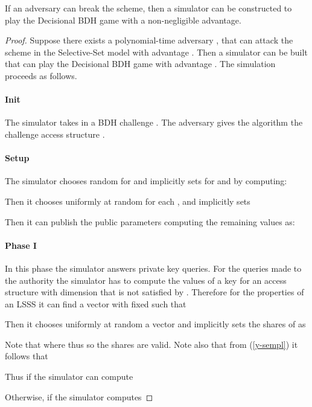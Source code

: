   \begin{theorem}
    If an adversary can break the scheme, then a simulator can be constructed to play the Decisional BDH game with a non-negligible advantage.
  \end{theorem}

  \begin{proof}
    Suppose there exists a polynomial-time adversary , that can attack the scheme in the Selective-Set model with advantage .
    Then a simulator  can be built that can play the Decisional BDH game with advantage .
    The simulation proceeds as follows.

    \paragraph*{Init}
      The simulator takes in a BDH challenge .
      The adversary gives the algorithm the challenge access structure .

    \paragraph*{Setup}
      The simulator chooses random  for  and implicitly sets  for  and  by computing:
      
      Then it chooses  uniformly at random for each ,  and implicitly sets
      
      Then it can publish the public parameters computing the remaining values as:
      

    \paragraph*{Phase I}
      In this phase the simulator answers private key queries.
      For the queries made to the authority  the simulator has to compute the  values of a key for an access structure  with dimension  that is not satisfied by .
      Therefore for the properties of an LSSS it can find a vector  with  fixed such that
      
      Then it chooses uniformly at random a vector  and implicitly sets the shares of  as
      
      Note that  where  thus \linebreak[4]  so the shares are valid.
      Note also that from (\ref{y-sempl}) it follows that
      
      Thus if  the simulator can compute
      
Otherwise, if  the simulator computes
      

\end{proof}
